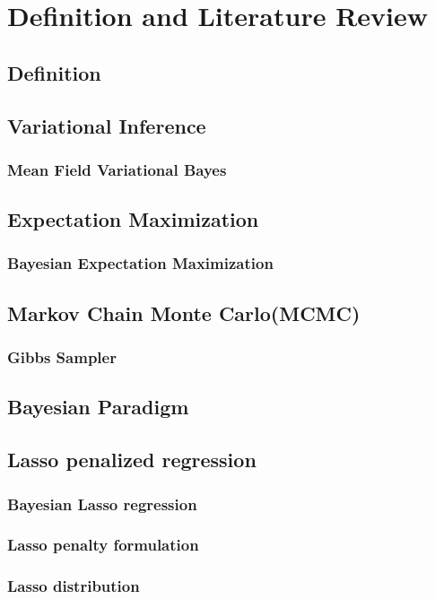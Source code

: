 \chapter{Definition and Literature Review}
\label{Chapter2}
\section{Definition}


\section{Variational Inference}
\subsection{Mean Field Variational Bayes}

\section{Expectation Maximization}
\subsection{Bayesian Expectation Maximization}

\section{Markov Chain Monte Carlo(MCMC)}
\subsection{Gibbs Sampler}

\section{Bayesian Paradigm}


\section{Lasso penalized regression}
\subsection{Bayesian Lasso regression}
\subsection{Lasso penalty formulation}
\subsection{Lasso distribution}


